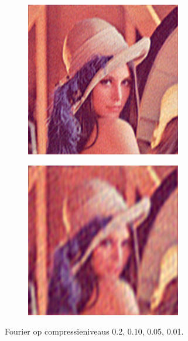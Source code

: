 \documentclass[11pt]{report}
\theoremstyle{plain}
\theoremstyle{remark}
\begin{document}
\begin{figure}
\begin{subfigure}[b]{0.24\textwidth}
	\end{subfigure}
	\begin{subfigure}[b]{0.24\textwidth}
		\centering
		\includegraphics[width=\textwidth]{plaatjes/Lenna_fourier_0_05.png}
	\end{subfigure}
	\begin{subfigure}[b]{0.24\textwidth}
		\centering
		\includegraphics[width=\textwidth]{plaatjes/Lenna_fourier_0_01.png}
	\end{subfigure}
	\caption{Fourier op compressieniveaus 0.2, 0.10, 0.05, 0.01.}
\end{figure}
\end{document}
